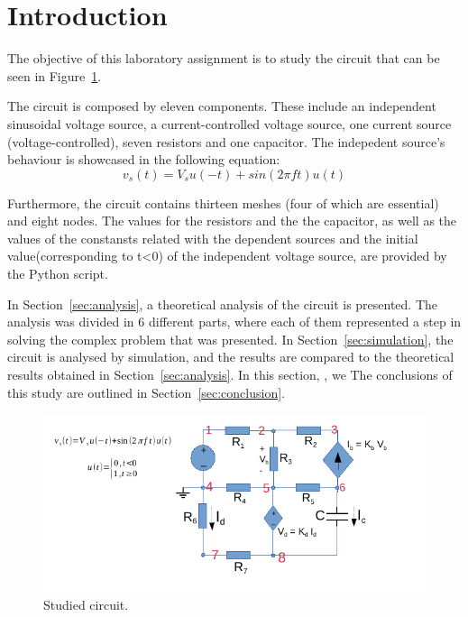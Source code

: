 \section{Introduction}
\label{sec:introduction}

The objective of this laboratory assignment is to study the circuit that can be seen in Figure~\ref{fig:T2Circuit}.
 
The circuit is composed by eleven components. These include an independent sinusoidal voltage source, a current-controlled voltage source, one current source (voltage-controlled), seven resistors and one capacitor.
The indepedent source's behaviour is showcased in the following equation:
\begin {equation}
   v_s(t)= V_s u(-t) + sin(2\pi f t)u(t)
   \end {equation}
   
 Furthermore, the circuit contains thirteen meshes (four of which are essential) and eight nodes.
The values for the resistors and the the capacitor, as well as the values of the constansts related with the dependent sources and the initial value(corresponding to t<0) of the independent voltage source, are provided by the Python script.

In Section~\ref{sec:analysis}, a theoretical analysis of the circuit is
presented. The analysis was divided in 6 different parts, where each of them represented a step in solving the complex problem that was presented. In Section~\ref{sec:simulation}, the circuit is analysed by
simulation, and the results are compared to the theoretical results obtained in Section~\ref{sec:analysis}. In this section, , we  The conclusions of this study are outlined in
Section~\ref{sec:conclusion}.

\vspace{4.0cm}

\begin{figure}[h] \centering
\includegraphics[width=0.8\linewidth]{T2Circuit.pdf}
\caption{Studied circuit.}
\label{fig:T2Circuit}
\end{figure}
